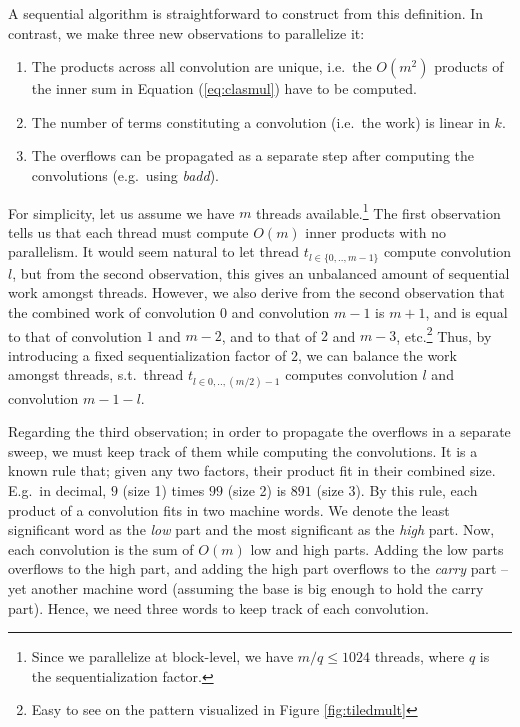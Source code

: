 A sequential algorithm is straightforward to construct from this definition. In
contrast, we make three new observations to parallelize it:
\begin{enumerate}[label=--]
\item The products across all convolution are unique, i.e.\ the $O(m^2)$
  products of the inner sum in Equation (\ref{eq:clasmul}) have to be computed.
\item The number of terms constituting a convolution (i.e.\ the work) is linear
  in $k$.
\item The overflows can be propagated as a separate step after computing the
  convolutions (e.g.\ using \textit{badd}).
\end{enumerate}

For simplicity, let us assume we have $m$ threads available.\footnote{Since we
  parallelize at block-level, we have $m/q \leq 1024$ threads, where $q$ is the
  sequentialization factor.} The first observation tells us that each thread
must compute $O(m)$ inner products with no parallelism. It would seem natural to
let thread $t_{l\in\{0,..,m-1\}}$ compute convolution $l$, but from the second
observation, this gives an unbalanced amount of sequential work amongst
threads. However, we also derive from the second observation that the combined
work of convolution $0$ and convolution ${m-1}$ is $m+1$, and is equal to that
of convolution $1$ and ${m-2}$, and to that of $2$ and ${m-3}$,
etc.\footnote{Easy to see on the pattern visualized in Figure
  \ref{fig:tiledmult}} Thus, by introducing a fixed sequentialization factor of
$2$, we can balance the work amongst threads, s.t.\ thread
$t_{l\in 0,..,(m/2)-1}$ computes convolution $l$ and convolution $m-1-l$.

Regarding the third observation; in order to propagate the overflows in a
separate sweep, we must keep track of them while computing the convolutions. It
is a known rule that; given any two factors, their product fit in their combined
size. E.g.\ in decimal, $9$ (size 1) times $99$ (size 2) is $891$ (size 3). By
this rule, each product of a convolution fits in two machine words. We denote
the least significant word as the \textit{low} part and the most significant as
the \textit{high} part. Now, each convolution is the sum of $O(m)$ low and high
parts. Adding the low parts overflows to the high part, and adding the high part
overflows to the \textit{carry} part -- yet another machine word (assuming the
base is big enough to hold the carry part). Hence, we need three words to keep
track of each convolution.

